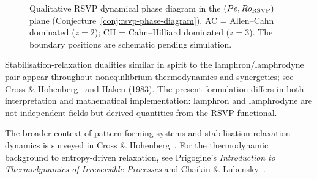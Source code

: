 \begin{figure}[ht]
\centering
{}
\caption{Qualitative RSVP dynamical phase diagram in the
         $(Pe, Ro_{\rm RSVP})$ plane
         (Conjecture~\ref{conj:rsvp-phase-diagram}).
         AC = Allen--Cahn dominated ($z=2$);
         CH = Cahn--Hilliard dominated ($z=3$).
         The boundary positions are schematic pending simulation.}
\label{fig:rsvp-phase-diagram}
\end{figure}

\begin{CitationAnchor}
  Stabilisation-relaxation dualities similar in spirit to the
  lamphron/lamphrodyne pair appear throughout nonequilibrium
  thermodynamics and synergetics; see Cross \& Hohenberg~\cite{cross1993}
  and Haken (1983).
  The present formulation differs in both interpretation and
  mathematical implementation: lamphron and lamphrodyne are
  not independent fields but derived quantities from the RSVP
  functional.
\end{CitationAnchor}

\begin{FurtherReading}
  The broader context of pattern-forming systems and
  stabilisation-relaxation dynamics is surveyed in
  Cross \& Hohenberg~\cite{cross1993}.
  For the thermodynamic background to entropy-driven relaxation,
  see Prigogine's \textit{Introduction to Thermodynamics of
  Irreversible Processes} and Chaikin \& Lubensky~\cite{chaikin1995}.
\end{FurtherReading}
